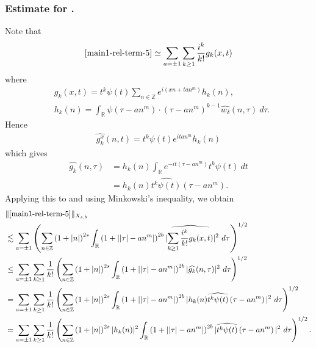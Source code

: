 \documentclass[12pt,reqno]{amsart}
\numberwithin{equation}{section}  %
\renewcommand{\cref}{\Cref}
\newcommand{\rr}{\mathbb{R}}
\newcommand{\zz}{\mathbb{Z}}
\newcommand{\wh}{\widehat}
\begin{document}
%
%
%
\subsubsection{Estimate for \cref{main1-rel-term-5}.}
Note that
%
%
\begin{equation}
	\label{1n}
	\begin{split}
    \cref{main1-rel-term-5} \simeq \sum_{a = \pm 1}\sum_{k \ge 1}
		\frac{i^k}{k!}g_k(x,t)
	\end{split}
\end{equation}
%
%
where 
%
%
\begin{equation*}
	\begin{split}
		& g_k(x,t) = t^k \psi(t) \sum_{n \in \zz} e^{i\left( xn + ta n^{m}
		\right)} h_k(n),
		\\
		& h_k(n) = \int_\rr \psi \left( \tau - an^{m} \right) \cdot \left(
		\tau - an^{m} \right)^{k -1} \wh{w_{\delta}}(n, \tau) \ d \tau.
	\end{split}
\end{equation*}
%
%
Hence
%
%
\begin{equation*}
	\begin{split}
		\wh{g_k^x}(n, t) = t^{k} \psi(t) e^{i t an^{m}} h_k(n)
	\end{split}
\end{equation*}
%
%
which gives
%
%
\begin{equation*}
	\begin{split}
		\wh{g_k}(n, \tau)
		& = h_k(n) \int_\rr e^{-it\left( \tau - an^{m} \right)}
		t^{k}\psi(t) \ dt
		\\
		& = h_k(n) \wh{t^{k}\psi(t)} \left( \tau - an^{m} \right).
	\end{split}
\end{equation*}
%
%
Applying this to \cref{1n} and using Minkowski's inequality, we obtain
%
%
\begin{equation}
	\label{2n}
	\begin{split}
		& \|\cref{main1-rel-term-5}\|_{X_{s,b}} 
    \\
    & \lesssim \sum_{a = \pm 1} \left( \sum_{n \in \zz} \left (1 + |n| \right )^{2s}
    \int_\rr \left( 1 + | |\tau| - an^{m} | \right)^{2b}
    | \wh{\sum_{k \ge 1} \frac{i^k}{k!}g_k(x,t)} |^2 \ d \tau
		\right)^{1/2}
		\\
		& \le \sum_{a = \pm 1}\sum_{k \ge 1} \frac{1}{k!}\left( \sum_{n \in \zz} \left (1 + |n| \right )^{2s}
    \int_\rr \left( 1 + | |\tau| - an^{m} | \right)^{2b} | \wh{g_k}(n, \tau) |^2 \
		d \tau \right)^{1/2}
		\\
		& = \sum_{a = \pm 1}\sum_{k \ge 1} \frac{1}{k!} \left( \sum_{n \in \zz} \left (1 + |n| \right )^{2s}
    \int_\rr \left( 1 + | |\tau| - an^{m} | \right)^{2b} | h_k(n) \wh{t^k
		\psi(t)} \left( \tau - an^{m} \right) |^2 \ d \tau \right)^{1/2}
		\\
		& = \sum_{a = \pm 1}\sum_{k \ge 1} \frac{1}{k!} \left( \sum_{n \in \zz} \left (1 + |n| \right )^{2s} |
    h_k(n) |^2 \int_\rr \left( 1 + | |\tau| - an^{m} | \right)^{2b} | \wh{t^k
		\psi(t)} \left( \tau - an^{m} \right) |^2 \ d \tau \right)^{1/2}.
	\end{split}
\end{equation}
\end{document}
